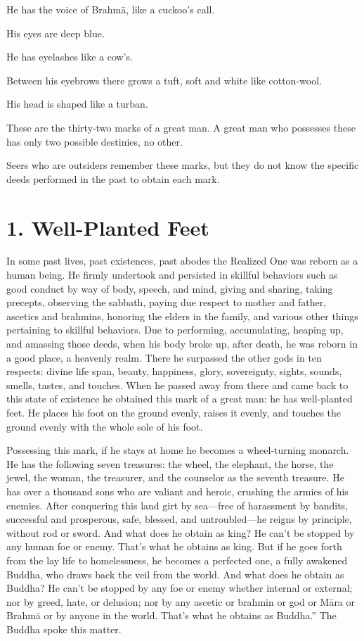 \documentclass[12pt,openany]{book}%
\begin{document}
He has the voice of \textsanskrit{Brahmā}, like a cuckoo’s call. 

His eyes are deep blue. 

He has eyelashes like a cow’s. 

Between his eyebrows there grows a tuft, soft and white like cotton-wool. 

His head is shaped like a turban. 

These are the thirty-two marks of a great man. A great man who possesses these has only two possible destinies, no other. 

Seers who are outsiders remember these marks, but they do not know the specific deeds performed in the past to obtain each mark. 

\section*{1. Well-Planted Feet }

In some past lives, past existences, past abodes the Realized One was reborn as a human being. He firmly undertook and persisted in skillful behaviors such as good conduct by way of body, speech, and mind, giving and sharing, taking precepts, observing the sabbath, paying due respect to mother and father, ascetics and brahmins, honoring the elders in the family, and various other things pertaining to skillful behaviors. Due to performing, accumulating, heaping up, and amassing those deeds, when his body broke up, after death, he was reborn in a good place, a heavenly realm. There he surpassed the other gods in ten respects: divine life span, beauty, happiness, glory, sovereignty, sights, sounds, smells, tastes, and touches. When he passed away from there and came back to this state of existence he obtained this mark of a great man: he has well-planted feet. He places his foot on the ground evenly, raises it evenly, and touches the ground evenly with the whole sole of his foot. 

Possessing this mark, if he stays at home he becomes a wheel-turning monarch. He has the following seven treasures: the wheel, the elephant, the horse, the jewel, the woman, the treasurer, and the counselor as the seventh treasure. He has over a thousand sons who are valiant and heroic, crushing the armies of his enemies. After conquering this land girt by sea—free of harassment by bandits, successful and prosperous, safe, blessed, and untroubled—he reigns by principle, without rod or sword. And what does he obtain as king? He can’t be stopped by any human foe or enemy. That’s what he obtains as king. But if he goes forth from the lay life to homelessness, he becomes a perfected one, a fully awakened Buddha, who draws back the veil from the world. And what does he obtain as Buddha? He can’t be stopped by any foe or enemy whether internal or external; nor by greed, hate, or delusion; nor by any ascetic or brahmin or god or \textsanskrit{Māra} or \textsanskrit{Brahmā} or by anyone in the world. That’s what he obtains as Buddha.” The Buddha spoke this matter. 
\end{document}
